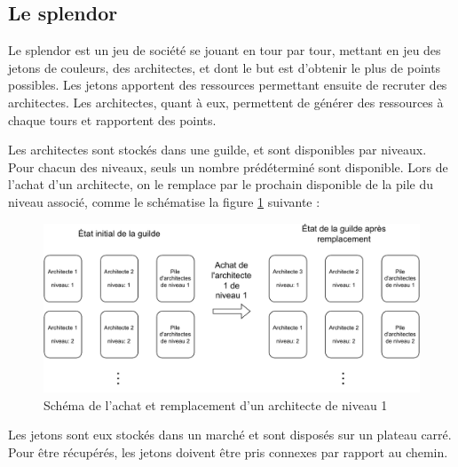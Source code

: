 
\subsection{Le splendor}

Le splendor est un jeu de société se jouant en tour par tour, mettant en jeu des jetons de couleurs, des architectes, et dont le but est d'obtenir le plus de points possibles. Les jetons apportent des ressources permettant ensuite de recruter des architectes. Les architectes, quant à eux, permettent de générer des ressources à chaque tours et rapportent des points.

Les architectes sont stockés dans une guilde, et sont disponibles par niveaux. Pour chacun des niveaux, seuls un nombre prédéterminé sont disponible. Lors de l'achat d'un architecte, on le remplace par le prochain disponible de la pile du niveau associé, comme le schématise la figure \ref{fig:buy_builder} suivante : 

\begin{figure}[H]
    \centering
    \includegraphics[width=.8\textwidth]{img/guild.pdf}
    \caption{Schéma de l'achat et remplacement d'un architecte de niveau 1}
    \label{fig:buy_builder}
\end{figure}

Les jetons sont eux stockés dans un marché et sont disposés sur un plateau carré. Pour être récupérés, les jetons doivent être pris connexes par rapport au chemin.


